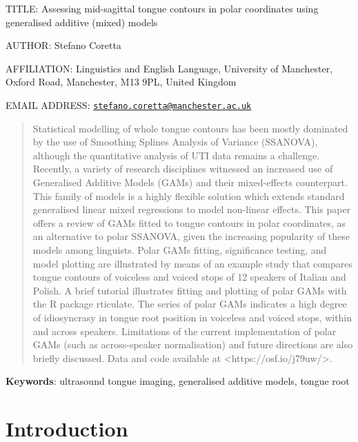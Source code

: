 \documentclass[
  11pt,
]{article}
\author{}
\date{\vspace{-2.5em}}
\begin{document}
\large

TITLE: Assessing mid-sagittal tongue contours in polar coordinates using
generalised additive (mixed) models

\vspace{1cm}

AUTHOR: Stefano Coretta

\vspace{1cm}

AFFILIATION: Linguistics and English Language, University of Manchester,
Oxford Road, Manchester, M13 9PL, United Kingdom

\vspace{1cm}

EMAIL ADDRESS:
\href{mailto:stefano.coretta@manchester.ac.uk}{\nolinkurl{stefano.coretta@manchester.ac.uk}}

\normalsize

\pagebreak

\begin{abstract}
Statistical modelling of whole tongue contours has been mostly dominated by the use of Smoothing Splines Analysis of Variance (SSANOVA), although the quantitative analysis of UTI data remains a challenge.
Recently, a variety of research disciplines witnessed an increased use of Generalised Additive Models (GAMs) and their mixed-effects counterpart.
This family of models is a highly flexible solution which extends standard generalised linear mixed regressions to model non-linear effects.
This paper offers a review of GAMs fitted to tongue contours in polar coordinates, as an alternative to polar SSANOVA, given the increasing popularity of these models among linguists.
Polar GAMs fitting, significance testing, and model plotting are illustrated by means of an example study that compares tongue contours of voiceless and voiced stops of 12 speakers of Italian and Polish.
A brief tutorial illustrates fitting and plotting of polar GAMs with the R package rticulate.
The series of polar GAMs indicates a high degree of idiosyncrasy in tongue root position in voiceless and voiced stops, within and across speakers.
Limitations of the current implementation of polar GAMs (such as across-speaker normalisation) and future directions are also briefly discussed.
Data and code available at <https://osf.io/j79uw/>.
\end{abstract}

\textbf{Keywords}: ultrasound tongue imaging, generalised additive
models, tongue root

\hypertarget{introduction}{%
\section{Introduction}\label{introduction}}
\end{document}
